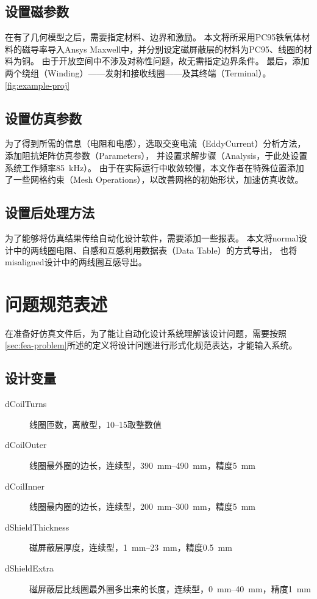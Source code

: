 \documentclass[index]{subfiles}
\begin{document}
\subsection{设置磁参数}
在有了几何模型之后，需要指定材料、边界和激励。
本文将所采用PC95铁氧体材料的磁导率导入Ansys Maxwell中，并分别设定磁屏蔽层的材料为PC95、线圈的材料为铜。
由于开放空间中不涉及对称性问题，故无需指定边界条件。
最后，添加两个绕组（Winding）——发射和接收线圈——及其终端（Terminal）。
\cref{fig:example-proj}

\subsection{设置仿真参数}
为了得到所需的信息（电阻和电感），选取交变电流（EddyCurrent）分析方法，添加阻抗矩阵仿真参数（Parameters），
并设置求解步骤（Analysis，于此处设置系统工作频率\SI{85}{\kilo\hertz}）。
由于在实际运行中收敛较慢，本文作者在特殊位置添加了一些网格约束（Mesh Operations），以改善网格的初始形状，加速仿真收敛。

\subsection{设置后处理方法}
为了能够将仿真结果传给自动化设计软件，需要添加一些报表。
本文将normal设计中的两线圈电阻、自感和互感利用数据表（Data Table）的方式导出，
也将misaligned设计中的两线圈互感导出。

\section{问题规范表述}
在准备好仿真文件后，为了能让自动化设计系统理解该设计问题，需要按照\cref{sec:fea-problem}所述的定义将设计问题进行形式化规范表达，才能输入系统。

\subsection{设计变量}
\begin{description}
  \item[dCoilTurns] 线圈匝数，离散型，\numrange{10}{15}取整数值
  \item[dCoilOuter] 线圈最外圈的边长，连续型，\SIrange{390}{490}{\milli\metre}，精度\SI{5}{\milli\metre}
  \item[dCoilInner] 线圈最内圈的边长，连续型，\SIrange{200}{300}{\milli\metre}，精度\SI{5}{\milli\metre}
  \item[dShieldThickness] 磁屏蔽层厚度，连续型，\SIrange{1}{23}{\milli\metre}，精度\SI{0.5}{\milli\metre}
  \item[dShieldExtra] 磁屏蔽层比线圈最外圈多出来的长度，连续型，\SIrange{0}{40}{\milli\metre}，精度\SI{1}{\milli\metre}
\end{description}
\end{document}

